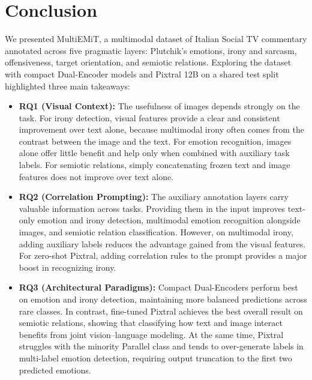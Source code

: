 \section{Conclusion}
\label{sec:conclusion}

We presented MultiEMiT, a multimodal dataset of Italian Social TV commentary annotated across five pragmatic layers: Plutchik's emotions, irony and sarcasm, offensiveness, target orientation, and semiotic relations. Exploring the dataset with compact Dual-Encoder models and Pixtral 12B on a shared test split highlighted three main takeaways:
\begin{itemize}
    \item \textbf{RQ1 (Visual Context):} The usefulness of images depends strongly on the task. For irony detection, visual features provide a clear and consistent improvement over text alone, because multimodal irony often comes from the contrast between the image and the text. For emotion recognition, images alone offer little benefit and help only when combined with auxiliary task labels. For semiotic relations, simply concatenating frozen text and image features does not improve over text alone.
    \item \textbf{RQ2 (Correlation Prompting):} The auxiliary annotation layers carry valuable information across tasks. Providing them in the input improves text-only emotion and irony detection, multimodal emotion recognition alongside images, and semiotic relation classification. However, on multimodal irony, adding auxiliary labels reduces the advantage gained from the visual features. For zero-shot Pixtral, adding correlation rules to the prompt provides a major boost in recognizing irony.
    \item \textbf{RQ3 (Architectural Paradigms):} Compact Dual-Encoders perform best on emotion and irony detection, maintaining more balanced predictions across rare classes. In contrast, fine-tuned Pixtral achieves the best overall result on semiotic relations, showing that classifying how text and image interact benefits from joint vision--language modeling. At the same time, Pixtral struggles with the minority Parallel class and tends to over-generate labels in multi-label emotion detection, requiring output truncation to the first two predicted emotions.
\end{itemize}

